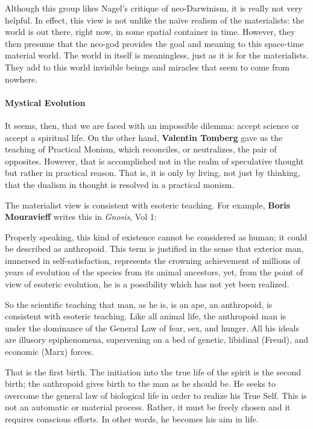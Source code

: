 Although this group likes Nagel's critique of neo-Darwinism, it is really not very helpful. In effect, this
view is not unlike the naïve realism of the materialists: the world is out there, right now, in some spatial container
in time. However, they then presume that the neo-god provides the goal and meaning to this space-time material world.
The world in itself is meaningless, just as it is for the materialists. They add to this world invisible beings and
miracles that seem to come from nowhere.

\paragraph{Mystical Evolution}
It seems, then, that we are faced with an impossible dilemma: accept science or accept a spiritual life. On the other
hand, \textbf{Valentin Tomberg} gave us the teaching of Practical Monism, which reconciles, or neutralizes, the pair of
opposites. However, that is accomplished not in the realm of speculative thought but rather in practical reason. That
is, it is only by living, not just by thinking, that the dualism in thought is resolved in a practical monism.

The materialist view is consistent with esoteric teaching. For example, \textbf{Boris Mouravieff} writes this in
\emph{Gnosis}, Vol 1:

\begin{quotex}
Properly speaking, this kind of existence cannot be considered as human; it could be described as anthropoid. This term
is justified in the sense that exterior man, immersed in self-satisfaction, represents the crowning achievement of
millions of years of evolution of the species from its animal ancestors, yet, from the point of view of esoteric
evolution, he is a possibility which has not yet been realized. 

\end{quotex}
So the scientific teaching that man, as he is, is an ape, an anthropoid, is consistent with esoteric teaching. Like all
animal life, the anthropoid man is under the dominance of the General Law of fear, sex, and hunger. All his ideals are
illusory epiphenomena, supervening on a bed of genetic, libidinal (Freud), and economic (Marx) forces.

That is the first birth. The initiation into the true life of the spirit is the second birth; the anthropoid gives birth
to the man as he should be. He seeks to overcome the general law of biological life in order to realize his True Self.
This is not an automatic or material process. Rather, it must be freely chosen and it requires conscious efforts. In
other words, he becomes his aim in life.

